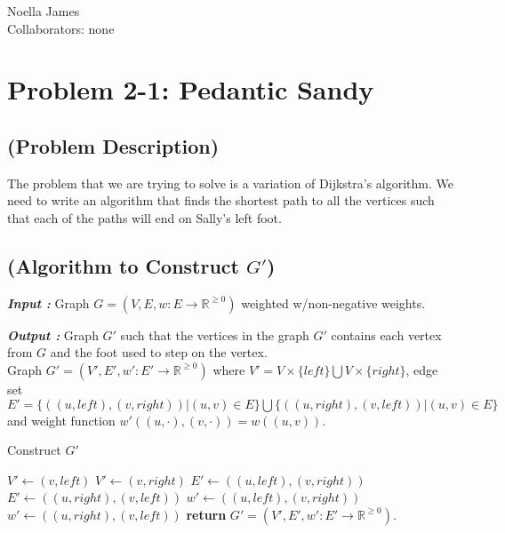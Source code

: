 \documentclass{article}
\theoremstyle{definition}
\theoremstyle{remark}
\theoremstyle{plain}
\begin{document}
Noella James\\
Collaborators: none\\

\section{Problem 2-1: Pedantic Sandy}

\subsection{(Problem Description)}
The problem that we are trying to solve is a variation of Dijkstra's algorithm. We need to write an algorithm that finds the shortest path to all the vertices such that each of the paths will end on Sally's left foot.\\

\subsection{(Algorithm to Construct $G'$)}

\textbf{\textit{Input :}}
Graph $G=(V,E, w:E \rightarrow \mathbb{R}^{\ge 0})$ weighted w/non-negative weights.

\textbf{\textit{Output :}}
Graph $G'$ such that the vertices in the graph $G'$ contains each vertex from $G$ and the foot used to step on the vertex. \\ 
Graph $G'=(V',E', w':E' \rightarrow \mathbb{R}^{\ge 0})$ where $V' =  V \times \{left\} \bigcup V \times \{right\}$, edge set $E' = \{((u, left), (v, right))|(u,v) \in E \}  \bigcup \{((u, right), (v, left))|(u, v) \in E \} $\\ and weight function $w'((u, \cdot),(v,\cdot)) = w((u,v)).$

\begin{algorithm}
\caption{Construct $G'$}\label{Construction of $G'$}
\begin{algorithmic}[1]
		\State $V' \gets (v, left)$ 
		\State $V' \gets (v, right)$ 
	\EndFor {}
		\State $E' \gets ((u, left), (v, right)) $ 
		\State $E' \gets ((u, right), (v, left)) $ 
	\EndFor  {}
		\State $w' \gets ((u, left), (v, right)) $ 
		\State $w' \gets ((u, right), (v, left)) $ 
	\EndFor  {}
	\State \textbf{return} $G'=(V',E', w':E' \rightarrow \mathbb{R}^{\ge 0})$.
\EndProcedure {}
\end{algorithmic}
\end{algorithm}
\end{document}
